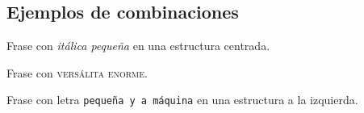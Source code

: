 \documentclass{article}
\begin{document}
\subsection{Ejemplos de combinaciones}
\begin{center}
Frase con \small{\textit{itálica pequeña}} en una estructura centrada.
\end{center}
Frase con {\Huge{\textsc{versálita enorme}}}.
\begin{flushleft}
Frase con letra {\tiny{\texttt{pequeña y a máquina}}} en una estructura a la izquierda.
\end{flushleft}
\end{document}
